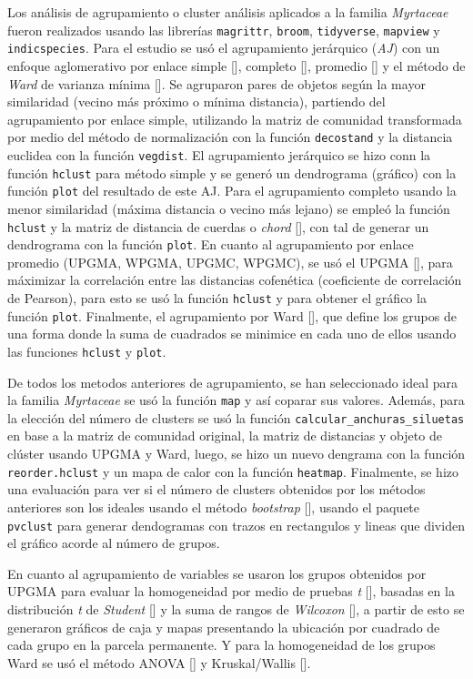 \documentclass[11pt,]{article}
\begin{document}
Los análisis de agrupamiento o cluster análisis aplicados a la familia
\emph{Myrtaceae} fueron realizados usando las librerías
\texttt{magrittr}, \texttt{broom}, \texttt{tidyverse}, \texttt{mapview}
y \texttt{indicspecies}. Para el estudio se usó el agrupamiento
jerárquico (\emph{AJ}) con un enfoque aglomerativo por enlace simple
{[}{]}, completo {[}{]}, promedio {[}{]} y el método de \emph{Ward} de
varianza mínima {[}{]}. Se agruparon pares de objetos según la mayor
similaridad (vecino más próximo o mínima distancia), partiendo del
agrupamiento por enlace simple, utilizando la matriz de comunidad
transformada por medio del método de normalización con la función
\texttt{decostand} y la distancia euclidea con la función
\texttt{vegdist}. El agrupamiento jerárquico se hizo conn la función
\texttt{hclust} para método simple y se generó un dendrograma (gráfico)
con la función \texttt{plot} del resultado de este AJ. Para el
agrupamiento completo usando la menor similaridad (máxima distancia o
vecino más lejano) se empleó la función \texttt{hclust} y la matriz de
distancia de cuerdas o \emph{chord} {[}{]}, con tal de generar un
dendrograma con la función \texttt{plot}. En cuanto al agrupamiento por
enlace promedio (UPGMA, WPGMA, UPGMC, WPGMC), se usó el UPGMA {[}{]},
para máximizar la correlación entre las distancias cofenética
(coeficiente de correlación de Pearson), para esto se usó la función
\texttt{hclust} y para obtener el gráfico la función \texttt{plot}.
Finalmente, el agrupamiento por Ward {[}{]}, que define los grupos de
una forma donde la suma de cuadrados se minimice en cada uno de ellos
usando las funciones \texttt{hclust} y \texttt{plot}.

De todos los metodos anteriores de agrupamiento, se han seleccionado
ideal para la familia \emph{Myrtaceae} se usó la función \texttt{map} y
así coparar sus valores. Además, para la elección del número de clusters
se usó la función \texttt{calcular\_anchuras\_siluetas} en base a la
matriz de comunidad original, la matriz de distancias y objeto de
clúster usando UPGMA y Ward, luego, se hizo un nuevo dengrama con la
función \texttt{reorder.hclust} y un mapa de calor con la función
\texttt{heatmap}. Finalmente, se hizo una evaluación para ver si el
número de clusters obtenidos por los métodos anteriores son los ideales
usando el método \emph{bootstrap} {[}{]}, usando el paquete
\texttt{pvclust} para generar dendogramas con trazos en rectangulos y
lineas que dividen el gráfico acorde al número de grupos.

En cuanto al agrupamiento de variables se usaron los grupos obtenidos
por UPGMA para evaluar la homogeneidad por medio de pruebas \emph{t}
{[}{]}, basadas en la distribución \emph{t} de \emph{Student} {[}{]} y
la suma de rangos de \emph{Wilcoxon} {[}{]}, a partir de esto se
generaron gráficos de caja y mapas presentando la ubicación por cuadrado
de cada grupo en la parcela permanente. Y para la homogeneidad de los
grupos Ward se usó el método ANOVA {[}{]} y Kruskal/Wallis {[}{]}.
\end{document}
